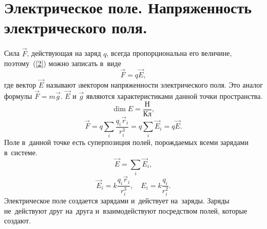 \section{Электрическое поле. Напряженность \,\, электрического поля.}

	Сила $\vec{F}$, действующая на заряд $q$, всегда пропорциональна его величине, поэтому~(\ref{2}) можно записать в~виде
		\begin{equation}
			\vec{F} = q\vec{E},
		\end{equation}
	где вектор $\vec{E}$ называют \i{вектором напряженности электрического поля}. Это аналог формулы $\vec{F}=m\vec{g}$. $\vec{E}$ и $\vec{g}$ являются характеристиками данной точки пространства.
		$$\dim{E}=\frac{\text{Н}}{\text{Кл}},$$
		$$\vec{F}=q\sum_i \frac{q_i\vec{r}_i}{r_i^3}=q\sum_i \vec{E}_i=q\vec{E}.$$
	Поле в~данной точке есть суперпозиция полей, порождаемых всеми зарядами в~системе.
		$$\vec{E}=\sum_i \vec{E}_i,$$
		$$\vec{E}_i=k\frac{q_i\vec{r}_i}{r_i^3}, \quad E_i = k\frac{q_i}{r_i^2}.$$
	Электрическое поле создается зарядами и~действует на~заряды. Заряды не~действуют друг на~друга и~взаимодействуют посредством полей, которые создают.
